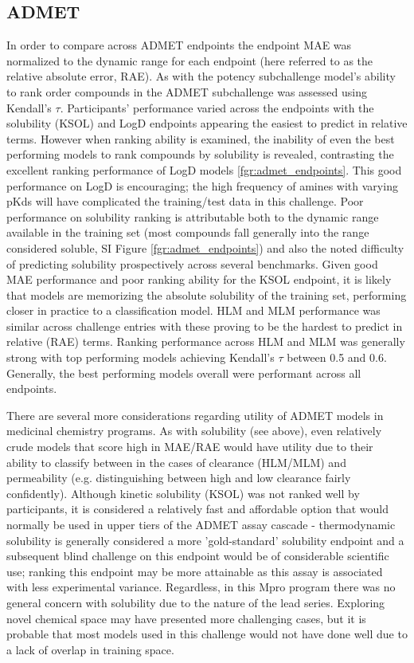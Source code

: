 \documentclass[journal=jcim,manuscript=article]{achemso}
\begin{document}
\subsection{ADMET}
In order to compare across ADMET endpoints the endpoint MAE was normalized to the dynamic range for each endpoint (here referred to as the relative absolute error, RAE). As with the potency subchallenge model's ability to rank order compounds in the ADMET subchallenge was assessed using Kendall's $\tau$. Participants' performance varied across the endpoints with the solubility (KSOL) and LogD endpoints appearing the easiest to predict in relative terms. However when ranking ability is examined, the inability of even the best performing models to rank compounds by solubility is revealed, contrasting the excellent ranking performance of LogD models \ref{fgr:admet_endpoints}. This good performance on LogD is encouraging; the high frequency of amines with varying pKds will have complicated the training/test data in this challenge. Poor performance on solubility ranking is attributable both to the dynamic range available in the training set (most compounds fall generally into the range considered soluble, SI Figure \ref{fgr:admet_endpoints}) and also the noted difficulty of predicting solubility prospectively across several benchmarks. Given good MAE performance and poor ranking ability for the KSOL endpoint, it is likely that models are memorizing the absolute solubility of the training set, performing closer in practice to a classification model. HLM and MLM performance was similar across challenge entries with these proving to be the hardest to predict in relative (RAE) terms. Ranking performance across HLM and MLM was generally strong with top performing models achieving Kendall's $\tau$ between 0.5 and 0.6. Generally, the best performing models overall were performant across all endpoints.

There are several more considerations regarding utility of ADMET models in medicinal chemistry programs. As with solubility (see above), even relatively crude models that score high in MAE/RAE would have utility due to their ability to classify between in the cases of clearance (HLM/MLM) and permeability (e.g. distinguishing between high and low clearance fairly confidently). Although kinetic solubility (KSOL) was not ranked well by participants, it is considered a relatively fast and affordable option that would normally be used in upper tiers of the ADMET assay cascade - thermodynamic solubility is generally considered a more 'gold-standard' solubility endpoint and a subsequent blind challenge on this endpoint would be of considerable scientific use; ranking this endpoint may be more attainable as this assay is associated with less experimental variance.\cite{llompart_minoletti_baybekov_horvath_marcou_varnek_2024} Regardless, in this Mpro program there was no general concern with solubility due to the nature of the lead series. Exploring novel chemical space may have presented more challenging cases, but it is probable that most models used in this challenge would not have done well due to a lack of overlap in training space.
\end{document}
